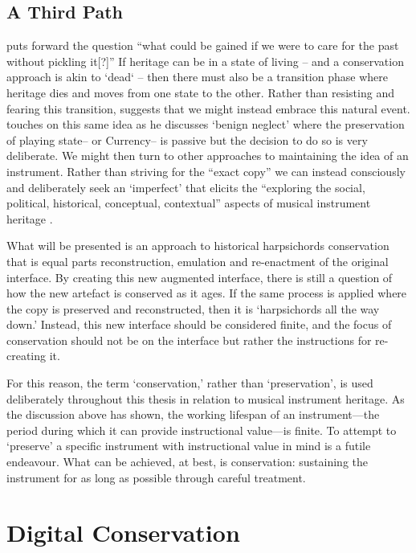 \subsection{A Third Path}

\textcite{desilvey_curated_2017} puts forward the question ``what could be
gained if we were to care for the past without pickling it[?]'' If heritage can
be in a state of living -- and a conservation approach is akin to `dead`
\cite{poulios_moving_2010} -- then there must also be a transition phase where
heritage dies and moves from one state to the other. Rather than resisting and
fearing this transition, \textcite{desilvey_curated_2017} suggests that we might
instead embrace this natural event. \textcite[p 75]{barclay_preservation_2005}
touches on this same idea as he discusses `benign neglect' where the
preservation of playing state-- or Currency-- is passive but the decision to do
so is very deliberate. We might then turn to other approaches to maintaining the
idea of an instrument. Rather than striving for the ``exact copy'' we can
instead consciously and deliberately seek an `imperfect' that elicits the
``exploring the social, political, historical, conceptual, contextual'' aspects
of musical instrument heritage \cite{holzer_imperfect_2025}.

What will be presented is an approach to historical harpsichords conservation
that is equal parts reconstruction, emulation and re-enactment of the original
interface. By creating this new augmented interface, there is still a question
of how the new artefact is conserved as it ages. If the same process is applied
where the copy is preserved and reconstructed, then it is `harpsichords all the
way down.' Instead, this new interface should be considered finite, and the
focus of conservation should not be on the interface but rather the instructions
for re-creating it.

For this reason, the term `conservation,' rather than `preservation', is used
deliberately throughout this thesis in relation to musical instrument heritage.
As the discussion above has shown, the working lifespan of an instrument---the
period during which it can provide instructional value---is finite. To attempt
to `preserve' a specific instrument with instructional value in mind is a futile
endeavour. What can be achieved, at best, is conservation: sustaining the
instrument for as long as possible through careful treatment.


\section{Digital Conservation}

